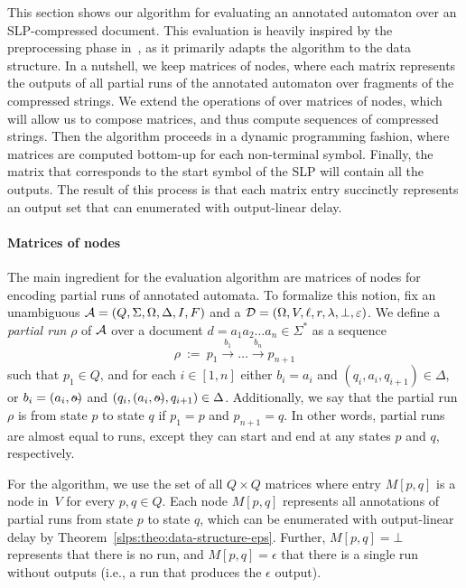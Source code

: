 
This section shows our algorithm for evaluating an annotated automaton over an SLP-compressed document. This evaluation is heavily inspired by the preprocessing phase in~\cite{SchmidS21}, as it primarily adapts the algorithm to the \dsabbr{} data structure. In a nutshell, we keep matrices of \dsabbr{} nodes, where each matrix represents the outputs of all partial runs of the annotated automaton over fragments of the compressed strings. We extend the operations of \dsabbr{} over matrices of nodes, which will allow us to compose matrices, and thus compute sequences of compressed strings. Then the algorithm proceeds in a dynamic programming fashion, where matrices are computed bottom-up for each non-terminal symbol. Finally, the matrix that corresponds to the start symbol of the SLP will contain all the outputs. The result of this process is that each matrix entry succinctly represents an output set 
that can enumerated with output-linear delay.


\paragraph{Matrices of nodes} 
The main ingredient for the evaluation algorithm are matrices of nodes for encoding partial runs of annotated automata. To formalize this notion, fix an unambiguous \rt $\mathcal{A} = (Q, \Sigma, \Omega, \Delta, I, F)$ and a \dsabbr{} $\mathcal{D} = (\Omega, V, \ell, r, \lambda, \bot, \varepsilon)$. We define a \emph{partial run} $\rho$ of $\mathcal{A}$ over a document $d = a_1a_2\ldots a_n \in\Sigma^*$ as a sequence 
\[
\rho \ := \ p_1 \xrightarrow{b_1} \ldots \xrightarrow{b_n} p_{n+1}
\]
such that $p_1\in Q$, and for each $i\in[1,n]$ either $b_i = a_i$ and $(q_{i}, a_i, q_{i+1})\in \Delta$, or $b_i = (a_i, \oout)$ and $(q_{i}, (a_i, \oout), q_{i+1})\in \Delta$. Additionally, we say that the partial run $\rho$ is from state $p$ to state $q$ if $p_1 = p$ and $p_{n+1} = q$. In other words, partial runs are almost equal to runs, except they can start and end at any states $p$ and $q$, respectively.
 
For the algorithm, we use the set of all $Q\times Q$ matrices where entry $M[p,q]$ is a node in~$V$ for every $p,q \in Q$.
Each node $M[p,q]$ represents all annotations %
of partial runs from state $p$ to  state $q$, which can be enumerated with output-linear delay by Theorem~\ref{slps:theo:data-structure-eps}. Further, $M[p,q] = \bot$ represents that there is no run, and $M[p,q] = \epsilon$ that there is a single run without outputs (i.e., a run that produces the $\epsilon$ output). 

